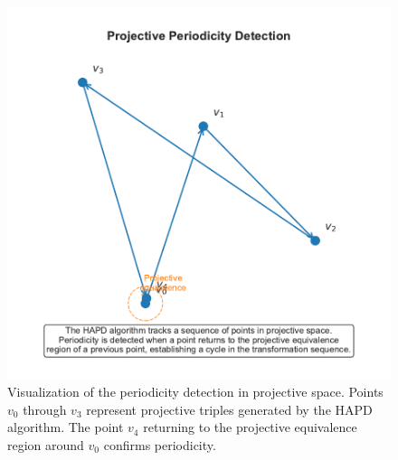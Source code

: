 \begin{figure}[htbp]
\begin{minipage}{\textwidth}
\centering
\includegraphics[width=\textwidth]{figures/output/projective_periodicity_visualization.pdf}
\caption{Visualization of the periodicity detection in projective space. Points $v_0$ through $v_3$ represent projective triples generated by the HAPD algorithm. The point $v_4$ returning to the projective equivalence region around $v_0$ confirms periodicity.}
\label{fig:projective_visualization}
\end{minipage}
\end{figure}

